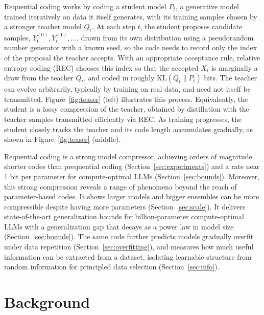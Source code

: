 \documentclass{article}
\theoremstyle{plain}
\theoremstyle{definition}
\theoremstyle{remark}
\begin{document}
Requential coding works by coding a student model $P_t$, a generative model trained iteratively on data it itself generates, with its training samples chosen by a stronger teacher model $Q_t$. At each step $t$, the student proposes candidate samples, $Y_t^{(0)}, Y_t^{(1)}, \ldots$, drawn from its own distribution using a pseudorandom number generator with a known seed, so the code needs to record only the index of the proposal the teacher accepts. With an appropriate acceptance rule, relative entropy coding (REC) \citep{flamich2020compressing,theis2022algorithms} chooses this index so that the accepted $X_t$ is marginally a draw from the teacher $Q_t$, and coded in roughly $\mathrm{KL}(Q_t\|P_t)$ bits.
The teacher can evolve arbitrarily, typically by training on real data, and need not itself be transmitted.  Figure~\ref{fig:teaser} (left) illustrates this process.
Equivalently, the student is a lossy compression of the teacher, obtained by distillation with the teacher samples transmitted efficiently via REC.
As training progresses, the student closely tracks the teacher and its code length accumulates gradually, as shown in Figure~\ref{fig:teaser} (middle).

Requential coding is a strong model compressor, achieving orders of magnitude shorter codes than prequential coding (Section~\ref{sec:experiments}) and a rate near 1 bit per parameter for compute-optimal LLMs (Section~\ref{sec:bounds}). Moreover, this strong compression reveals a range of phenomena beyond the reach of parameter-based codes. It shows larger models and bigger ensembles can be more compressible despite having more parameters (Section~\ref{sec:scale}). It delivers state-of-the-art generalization bounds for billion-parameter compute-optimal LLMs with a generalization gap that decays as a power law in model size (Section~\ref{sec:bounds}). The same code further predicts models gradually overfit under data repetition (Section~\ref{sec:overfitting}), and measures how much useful information can be extracted from a dataset, isolating learnable structure from random information for principled data selection (Section~\ref{sec:info}).

%

%

%
%
%

%




\section{Background}
\end{document}

